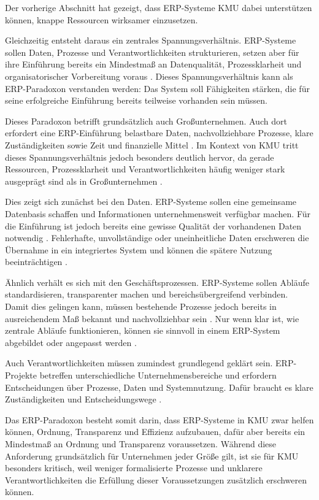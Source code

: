 
Der vorherige Abschnitt hat gezeigt, dass ERP-Systeme KMU dabei unterstützen
können, knappe Ressourcen wirksamer einzusetzen. 

Gleichzeitig entsteht daraus ein zentrales Spannungsverhältnis. ERP-Systeme
sollen Daten, Prozesse und Verantwortlichkeiten strukturieren, setzen aber für
ihre Einführung bereits ein Mindestmaß an Datenqualität, Prozessklarheit und
organisatorischer Vorbereitung voraus \parencite{Jha2008,Leyh2015}. Dieses Spannungsverhältnis kann als
ERP-Paradoxon verstanden werden: Das System soll Fähigkeiten stärken, die für
seine erfolgreiche Einführung bereits teilweise vorhanden sein müssen.

Dieses Paradoxon betrifft grundsätzlich auch Großunternehmen. Auch dort
erfordert eine ERP-Einführung belastbare Daten, nachvollziehbare Prozesse,
klare Zuständigkeiten sowie Zeit und finanzielle Mittel \parencite{Leyh2015}. Im Kontext von KMU
tritt dieses Spannungsverhältnis jedoch besonders deutlich hervor, da gerade
Ressourcen, Prozessklarheit und Verantwortlichkeiten häufig weniger stark
ausgeprägt sind als in Großunternehmen \parencite{Leyh2015,Jha2008,Nach2008}. 

Dies zeigt sich zunächst bei den Daten. ERP-Systeme sollen eine gemeinsame
Datenbasis schaffen und Informationen unternehmensweit verfügbar machen. Für
die Einführung ist jedoch bereits eine gewisse Qualität der vorhandenen Daten
notwendig \parencite{Leyh2017,Yusuf2024}. Fehlerhafte, unvollständige oder uneinheitliche Daten erschweren die
Übernahme in ein integriertes System und können die spätere Nutzung
beeinträchtigen \parencite{Jha2008}. 

Ähnlich verhält es sich mit den Geschäftsprozessen. ERP-Systeme sollen Abläufe
standardisieren, transparenter machen und bereichsübergreifend verbinden. Damit
dies gelingen kann, müssen bestehende Prozesse jedoch bereits in ausreichendem
Maß bekannt und nachvollziehbar sein \parencite{Leyh2015,Alaskari2021}. Nur wenn klar ist, wie zentrale Abläufe
funktionieren, können sie sinnvoll in einem ERP-System abgebildet oder
angepasst werden \parencite{Leyh2015}.

Auch Verantwortlichkeiten müssen zumindest grundlegend
geklärt sein. ERP-Projekte betreffen unterschiedliche Unternehmensbereiche und
erfordern Entscheidungen über Prozesse, Daten und Systemnutzung. Dafür braucht
es klare Zuständigkeiten und Entscheidungswege \parencite{Leyh2017,Leyh2015}. 

Das ERP-Paradoxon besteht somit darin, dass ERP-Systeme in KMU zwar helfen
können, Ordnung, Transparenz und Effizienz aufzubauen, dafür aber bereits ein
Mindestmaß an Ordnung und Transparenz voraussetzen. Während diese
Anforderung grundsätzlich für Unternehmen jeder Größe gilt, ist sie für KMU
besonders kritisch, weil weniger formalisierte Prozesse
und unklarere Verantwortlichkeiten die Erfüllung dieser Voraussetzungen
zusätzlich erschweren können.
